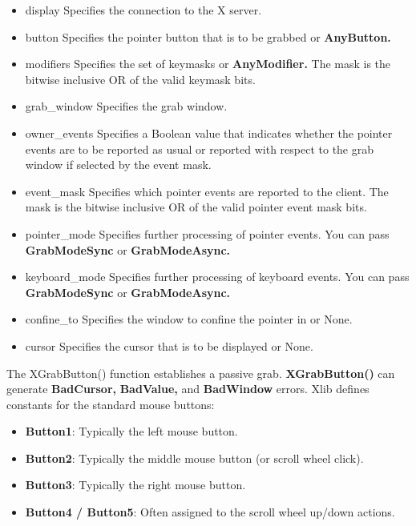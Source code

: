\documentclass{report}
\begin{document}
\begin{itemize}
            \bigbreak \noindent
            \begin{itemize}
                \item display	Specifies the connection to the X server.
                \item button	Specifies the pointer button that is to be grabbed or \textbf{AnyButton.}
                \item modifiers	Specifies the set of keymasks or \textbf{AnyModifier.} The mask is the bitwise inclusive OR of the valid keymask bits.
                \item grab\_window	Specifies the grab window.
                \item owner\_events	Specifies a Boolean value that indicates whether the pointer events are to be reported as usual or reported with respect to the grab window if selected by the event mask.
                \item event\_mask	Specifies which pointer events are reported to the client. The mask is the bitwise inclusive OR of the valid pointer event mask bits.
                \item pointer\_mode	Specifies further processing of pointer events. You can pass \textbf{GrabModeSync} or \textbf{GrabModeAsync.}
                \item keyboard\_mode	Specifies further processing of keyboard events. You can pass \textbf{GrabModeSync} or \textbf{GrabModeAsync.}
                \item confine\_to	Specifies the window to confine the pointer in or None.
                \item cursor	Specifies the cursor that is to be displayed or None.
            \end{itemize}
            The XGrabButton() function establishes a passive grab. \textbf{XGrabButton()} can generate \textbf{BadCursor,} \textbf{BadValue,} and \textbf{BadWindow} errors.
            \bigbreak \noindent 
            Xlib defines constants for the standard mouse buttons:
            \begin{itemize}
                \item \textbf{Button1}: Typically the left mouse button.
                \item \textbf{Button2}: Typically the middle mouse button (or scroll wheel click).
                \item \textbf{Button3}: Typically the right mouse button.
                \item \textbf{Button4 / Button5}: Often assigned to the scroll wheel up/down actions.

\end{itemize}
\end{itemize}
\end{document}
